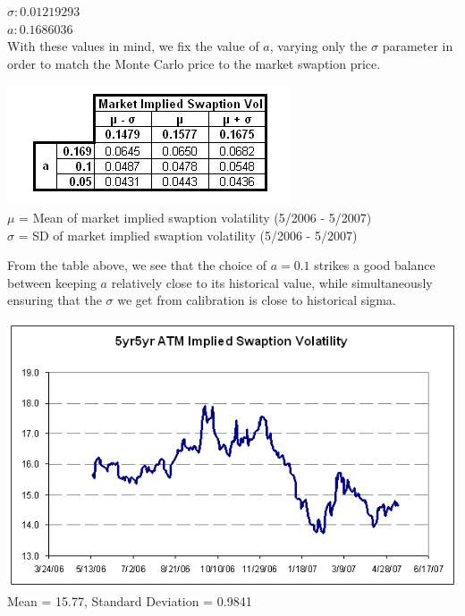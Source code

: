 \documentclass[10pt,letterpaper]{article}
\begin{document}
$\sigma: 0.01219293$\\
$a: 0.1686036$\\
With these values in mind, we fix the value of $a$, varying only the $\sigma$ parameter in order to match the Monte Carlo price to the market swaption price.\\
\begin{center}
\includegraphics[scale=0.7]{mktvoltable.png}\\
$\mu$ = Mean of market implied swaption volatility (5/2006 - 5/2007)\\
$\sigma$ = SD of market implied swaption volatility (5/2006 - 5/2007)\\
\end{center}
From the table above, we see that the choice of $a = 0.1$ strikes a good balance between keeping $a$ relatively close to its historical value, while simultaneously ensuring that the $\sigma$ we get from calibration is close to historical sigma.\\
\begin{center}
\includegraphics[scale=0.5]{swaption.png}\\
Mean = 15.77, Standard Deviation = 0.9841
\end{center}
\end{document}
